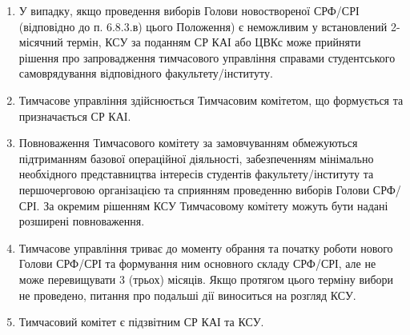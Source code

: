         \begin{enumerate}[label=\alph*)]
            \item У випадку, якщо проведення виборів Голови новоствореної СРФ/СРІ (відповідно до п. 6.8.3.в) цього Положення) є неможливим у встановлений 2-місячний термін, КСУ за поданням СР КАІ або ЦВКс може прийняти рішення про запровадження тимчасового управління справами студентського самоврядування відповідного факультету/інституту.

            \item Тимчасове управління здійснюється Тимчасовим комітетом, що формується та призначається СР КАІ.
            \item Повноваження Тимчасового комітету за замовчуванням обмежуються підтриманням базової операційної діяльності, забезпеченням мінімально необхідного представництва інтересів студентів факультету/інституту та першочерговою організацією та сприянням проведенню виборів Голови СРФ/СРІ. За окремим рішенням КСУ Тимчасовому комітету можуть бути надані розширені повноваження.
            \item Тимчасове управління триває до моменту обрання та початку роботи нового Голови СРФ/СРІ та формування ним основного складу СРФ/СРІ, але не може перевищувати 3 (трьох) місяців. Якщо протягом цього терміну вибори не проведено, питання про подальші дії виноситься на розгляд КСУ.
            \item Тимчасовий комітет є підзвітним СР КАІ та КСУ.
        \end{enumerate} 